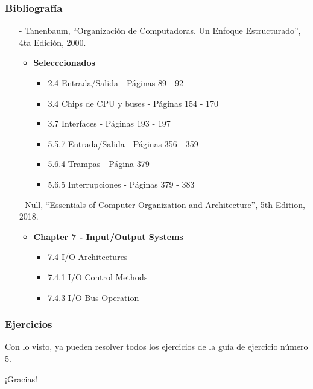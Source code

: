 \documentclass[aspectratio=169]{beamer}
\begin{document}
\begin{frame}[fragile]
    \frametitle{Bibliografía}
    \begin{itemize}
     \setlength\itemsep{0.5cm}
    \item[-] \small Tanenbaum, “Organización de Computadoras. Un Enfoque Estructurado”, 4ta Edición, 2000.\\
    \begin{itemize}
     \item \textbf{Selecccionados}\\
     \begin{itemize}
      \item 2.4 Entrada/Salida - Páginas 89 - 92
      \item 3.4 Chips de CPU y buses - Páginas 154 - 170
      \item 3.7 Interfaces - Páginas 193 - 197
      \item 5.5.7 Entrada/Salida - Páginas 356 - 359
      \item 5.6.4 Trampas - Página 379
      \item 5.6.5 Interrupciones - Páginas 379 - 383
     \end{itemize}
    \end{itemize}
    \item[-] \small Null, “Essentials of Computer Organization and Architecture”, 5th Edition, 2018.\\
    \begin{itemize}
    \item \textbf{Chapter 7 - Input/Output Systems}    
     \begin{itemize}
        \item 7.4 I/O Architectures
        \item 7.4.1 I/O Control Methods
        \item 7.4.3 I/O Bus Operation
     \end{itemize}
    \end{itemize}
    \end{itemize}
\end{frame}

\begin{frame}[fragile]
    \frametitle{Ejercicios}
    Con lo visto, ya pueden resolver todos los ejercicios de la guía de ejercicio número 5.
\end{frame}

\begin{frame}[plain]
    \begin{center}
    \vspace{2cm}
    \huge ¡Gracias!\\
    \vspace{2cm}
    \end{center}
\end{frame}
\end{document}
